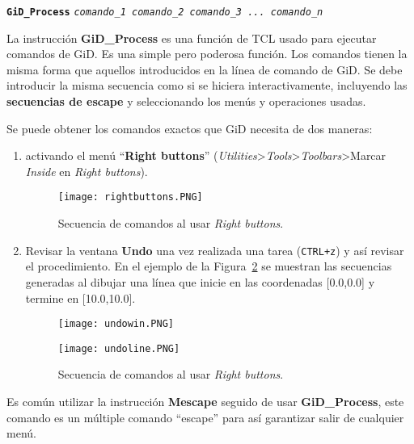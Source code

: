 \documentclass[10pt, a4paper, twocolumn]{article} %
\begin{document}
\vspace{0.20cm}
\begin{center}
	\textbf{\texttt{GiD\_Process}} \texttt{\textit{comando\_1 comando\_2 comando\_3 ... comando\_n}}
\end{center}
\vspace{0.20cm}


La instrucción \textbf{GiD\_Process} es una función de TCL usado para ejecutar comandos de GiD. Es una simple pero poderosa función. Los comandos tienen la misma forma que aquellos introducidos en la línea de comando de GiD. Se debe introducir la misma secuencia como si se hiciera interactivamente, incluyendo las \textbf{secuencias de escape} y seleccionando los menús y operaciones usadas.

Se puede obtener los comandos exactos que GiD necesita de dos maneras:

\begin{enumerate}
	\item activando el menú ``\textbf{Right buttons}'' (\textit{Utilities}>\textit{Tools}>\textit{Toolbars}>Marcar \textit{Inside} en \textit{Right buttons}).	
	\begin{figure}[hbtp!]
	\centering
	\texttt{[image: rightbuttons.PNG]}
	\caption{Secuencia de comandos al usar \textit{Right buttons}.\label{fig:rightbuttons}}
\end{figure}
	\item Revisar la ventana \textbf{Undo} una vez realizada una tarea (\texttt{CTRL+z}) y así revisar el procedimiento. En el ejemplo de la Figura~\ref{fig:undo} se muestran las secuencias generadas al dibujar una línea que inicie en las coordenadas [0.0,0.0] y termine en [10.0,10.0].
	\begin{figure}[hbtp!]
	\centering
	\begin{minipage}[t]{0.2\textwidth}
	\texttt{[image: undowin.PNG]}
	\end{minipage}
	\begin{minipage}[t]{0.16\textwidth}
	\texttt{[image: undoline.PNG]}
	\end{minipage}
	\caption{Secuencia de comandos al usar \textit{Right buttons}.\label{fig:undo}}
\end{figure}
	
\end{enumerate}

Es común utilizar la instrucción \textbf{Mescape} seguido de usar \textbf{GiD\_Process}, este comando es un múltiple comando ``escape'' para así garantizar salir de cualquier menú.
\end{document}
